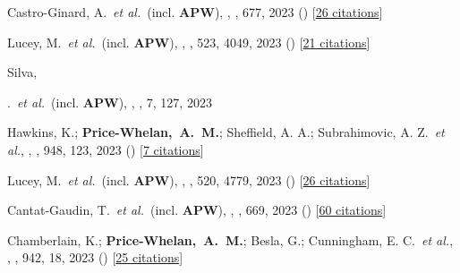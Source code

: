 \item[{\color{deemph}\scriptsize118}]Castro-Ginard, A.~\textit{et al.}~(incl. \textbf{APW}), , \aanda, 677, 2023 () [\href{http://adsabs.harvard.edu/abs/2023A&A...677A..37C}{26 citations}]

\item[{\color{deemph}\scriptsize117}]Lucey, M.~\textit{et al.}~(incl. \textbf{APW}), , \mnras, 523, 4049, 2023 () [\href{http://adsabs.harvard.edu/abs/2023MNRAS.523.4049L}{21 citations}]

\item[{\color{deemph}\scriptsize116}]Silva, {.~\textit{et al.}~(incl. \textbf{APW}), , \rnaas, 7, 127, 2023

\item[{\color{deemph}\scriptsize115}]Hawkins, K.; \textbf{Price-Whelan,~A.~M.}; Sheffield, A. A.; Subrahimovic, A. Z.~\textit{et al.}, , \apj, 948, 123, 2023 () [\href{http://adsabs.harvard.edu/abs/2023ApJ...948..123H}{7 citations}]

\item[{\color{deemph}\scriptsize114}]Lucey, M.~\textit{et al.}~(incl. \textbf{APW}), , \mnras, 520, 4779, 2023 () [\href{http://adsabs.harvard.edu/abs/2023MNRAS.520.4779L}{26 citations}]

\item[{\color{deemph}\scriptsize113}]Cantat-Gaudin, T.~\textit{et al.}~(incl. \textbf{APW}), , \aanda, 669, 2023 () [\href{http://adsabs.harvard.edu/abs/2023A&A...669A..55C}{60 citations}]

\item[{\color{deemph}\scriptsize112}]Chamberlain, K.; \textbf{Price-Whelan,~A.~M.}; Besla, G.; Cunningham, E. C.~\textit{et al.}, , \apj, 942, 18, 2023 () [\href{http://adsabs.harvard.edu/abs/2023ApJ...942...18C}{25 citations}]

}
